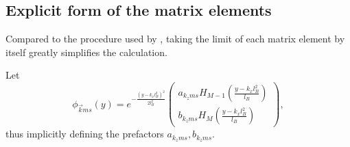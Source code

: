 \subsection{Explicit form of the matrix elements}
Compared to the procedure used by \citeauthor{arjonaFingerprintsConformalAnomaly2019}\cite{arjonaFingerprintsConformalAnomaly2019}, taking the limit of each matrix element by itself greatly simplifies the calculation.

Let
\begin{equation}
  \label{eq:50}
  \phi _{\vec{k}ms}(y)
  = e^{-\frac{(y-k_xl_B^2)^2}{2 l_{B}^2}}
  \begin{pmatrix}
    a_{k_zms} H_{M-1} \left( \frac{y - k_xl_B^2}{l_B} \right)\\
    b_{k_zms} H_M \left( \frac{y - k_xl_B^2}{l_B} \right)
  \end{pmatrix},
\end{equation}
thus implicitly defining the prefactors $a_{k_z ms}, b_{k_z ms}$.


